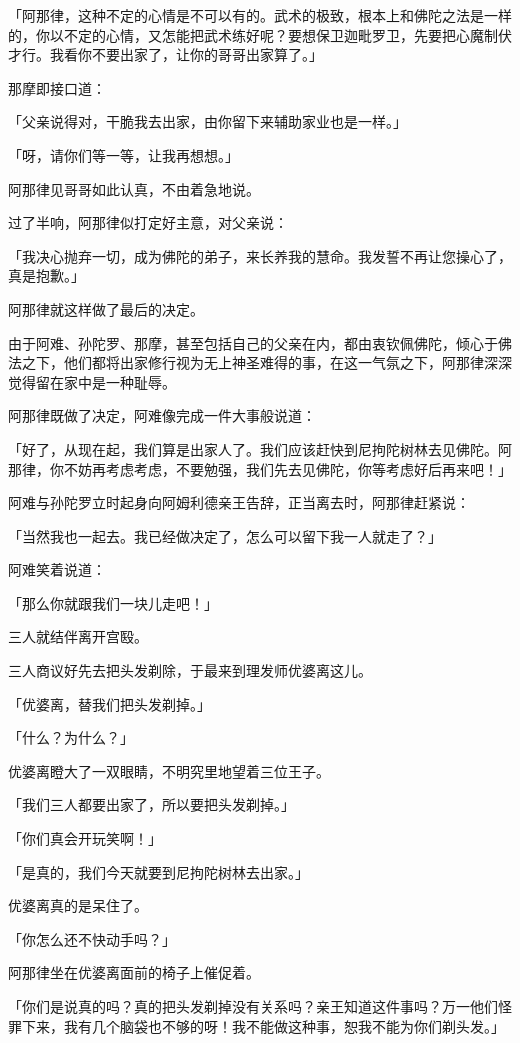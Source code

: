 \documentclass[twoside,openany]{book}
\begin{document}
「阿那律，这种不定的心情是不可以有的。武术的极致，根本上和佛陀之法是一样的，你以不定的心情，又怎能把武术练好呢？要想保卫迦毗罗卫，先要把心魔制伏才行。我看你不要出家了，让你的哥哥出家算了。」

那摩即接口道：

「父亲说得对，干脆我去出家，由你留下来辅助家业也是一样。」

「呀，请你们等一等，让我再想想。」

阿那律见哥哥如此认真，不由着急地说。

过了半响，阿那律似打定好主意，对父亲说：

「我决心抛弃一切，成为佛陀的弟子，来长养我的慧命。我发誓不再让您操心了，真是抱歉。」

阿那律就这样做了最后的决定。

由于阿难、孙陀罗、那摩，甚至包括自己的父亲在内，都由衷钦佩佛陀，倾心于佛法之下，他们都将出家修行视为无上神圣难得的事，在这一气氛之下，阿那律深深觉得留在家中是一种耻辱。

阿那律既做了决定，阿难像完成一件大事般说道：

「好了，从现在起，我们算是出家人了。我们应该赶快到尼拘陀树林去见佛陀。阿那律，你不妨再考虑考虑，不要勉强，我们先去见佛陀，你等考虑好后再来吧！」

阿难与孙陀罗立时起身向阿姆利德亲王告辞，正当离去时，阿那律赶紧说：

「当然我也一起去。我已经做决定了，怎么可以留下我一人就走了？」

阿难笑着说道：

「那么你就跟我们一块儿走吧！」

三人就结伴离开宫殹。

三人商议好先去把头发剃除，于最来到理发师优婆离这儿。

「优婆离，替我们把头发剃掉。」

「什么？为什么？」

优婆离瞪大了一双眼睛，不明究里地望着三位王子。

「我们三人都要出家了，所以要把头发剃掉。」

「你们真会开玩笑啊！」

「是真的，我们今天就要到尼拘陀树林去出家。」

优婆离真的是呆住了。

「你怎么还不快动手吗？」

阿那律坐在优婆离面前的椅子上催促着。

「你们是说真的吗？真的把头发剃掉没有关系吗？亲王知道这件事吗？万一他们怪罪下来，我有几个脑袋也不够的呀！我不能做这种事，恕我不能为你们剃头发。」
\end{document}
